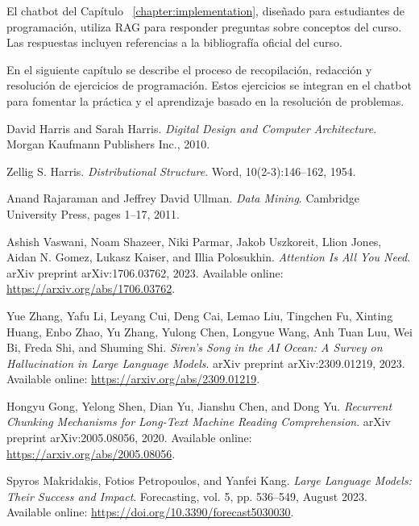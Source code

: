 \documentclass{article}
\begin{document}
El chatbot del Capítulo ~\ref{chapter:implementation}, diseñado para estudiantes de programación, utiliza RAG para responder preguntas sobre conceptos del curso. Las respuestas incluyen referencias a la bibliografía oficial del curso.

En el siguiente capítulo se describe el proceso de recopilación, redacción y resolución de ejercicios de programación. Estos ejercicios se integran en el chatbot para fomentar la práctica y el aprendizaje basado en la resolución de problemas.

\begin{thebibliography}{99}

David Harris and Sarah Harris.
\textit{Digital Design and Computer Architecture}. 
Morgan Kaufmann Publishers Inc., 2010.

Zellig S. Harris.
\textit{Distributional Structure}. 
Word, 10(2-3):146--162, 1954.

Anand Rajaraman and Jeffrey David Ullman.
\textit{Data Mining}. 
Cambridge University Press, pages 1--17, 2011.

Ashish Vaswani, Noam Shazeer, Niki Parmar, Jakob Uszkoreit, Llion Jones, Aidan N. Gomez, Lukasz Kaiser, and Illia Polosukhin. 
\textit{Attention Is All You Need}. 
arXiv preprint arXiv:1706.03762, 2023. 
Available online: \url{https://arxiv.org/abs/1706.03762}.

Yue Zhang, Yafu Li, Leyang Cui, Deng Cai, Lemao Liu, Tingchen Fu, Xinting Huang, Enbo Zhao, Yu Zhang, Yulong Chen, Longyue Wang, Anh Tuan Luu, Wei Bi, Freda Shi, and Shuming Shi. 
\textit{Siren's Song in the AI Ocean: A Survey on Hallucination in Large Language Models}. 
arXiv preprint arXiv:2309.01219, 2023. 
Available online: \url{https://arxiv.org/abs/2309.01219}.

Hongyu Gong, Yelong Shen, Dian Yu, Jianshu Chen, and Dong Yu. 
\textit{Recurrent Chunking Mechanisms for Long-Text Machine Reading Comprehension}. 
arXiv preprint arXiv:2005.08056, 2020. 
Available online: \url{https://arxiv.org/abs/2005.08056}.

Spyros Makridakis, Fotios Petropoulos, and Yanfei Kang. 
\textit{Large Language Models: Their Success and Impact}. 
Forecasting, vol. 5, pp. 536--549, August 2023. 
Available online: \url{https://doi.org/10.3390/forecast5030030}.


\end{thebibliography}
\end{document}

